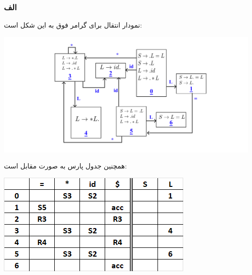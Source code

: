 \subsubsection*{الف}

نمودار انتقال برای گرامر فوق به این شکل است:

\qquad\qquad\qquad\qquad\qquad\includegraphics[width=1\linewidth]{figs/7.png}

همچنین جدول پارس به صورت مقابل است:

\quad\qquad\qquad\includegraphics[width=0.7\linewidth]{figs/8.png}